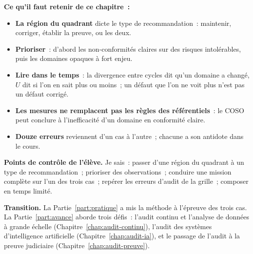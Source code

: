 
\separateur

\begin{boxresume}
\textbf{Ce qu'il faut retenir de ce chapitre~:}
\begin{itemize}
    \item \textbf{La région du quadrant} dicte le type de recommandation~:
          maintenir, corriger, établir la preuve, ou les deux.
    \item \textbf{Prioriser}~: d'abord les non-conformités claires sur des
          risques intolérables, puis les domaines opaques à fort enjeu.
    \item \textbf{Lire dans le temps}~: la divergence entre cycles dit qu'un
          domaine a changé, $U$ dit si l'on en sait plus ou moins~; un
          défaut que l'on ne voit plus n'est pas un défaut corrigé.
    \item \textbf{Les mesures ne remplacent pas les règles des
          référentiels}~: le COSO peut conclure à l'inefficacité d'un
          domaine en conformité claire.
    \item \textbf{Douze erreurs} reviennent d'un cas à l'autre~; chacune a
          son antidote dans le cours.
\end{itemize}
\end{boxresume}

\bigskip

\begin{boxinfo}
\textbf{Points de contrôle de l'élève.} Je sais~: passer d'une région du
quadrant à un type de recommandation~; prioriser des observations~;
conduire une mission complète sur l'un des trois cas~; repérer les erreurs
d'audit de la grille~; composer en temps limité.
\end{boxinfo}

\begin{boxinfo}
\textbf{Transition.} La Partie~\ref{part:pratique} a mis la méthode à
l'épreuve des trois cas. La Partie~\ref{part:avance} aborde trois défis~:
l'audit continu et l'analyse de données à grande échelle
(Chapitre~\ref{chap:audit-continu}), l'audit des systèmes d'intelligence
artificielle (Chapitre~\ref{chap:audit-ia}), et le passage de l'audit à la
preuve judiciaire (Chapitre~\ref{chap:audit-preuve}).
\end{boxinfo}
